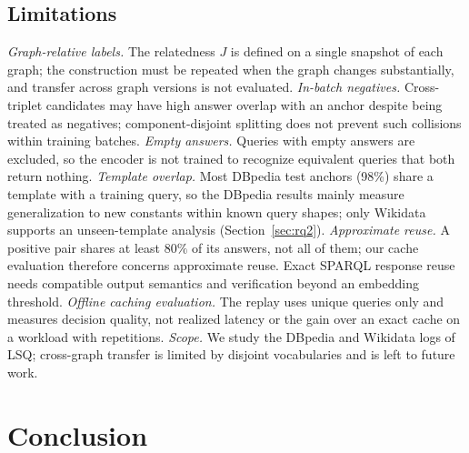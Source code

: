 \documentclass[runningheads]{llncs}
\begin{document}
\subsection{Limitations}
\label{sec:limitations}

\emph{Graph-relative labels.} The relatedness $J$ is defined on a single
snapshot of each graph; the construction must be repeated when the graph
changes substantially, and transfer across graph versions is not evaluated.
\emph{In-batch negatives.} Cross-triplet candidates may have high answer
overlap with an anchor despite being treated as negatives; component-disjoint
splitting does not prevent such collisions within training batches.
\emph{Empty answers.} Queries with empty answers are excluded, so the encoder
is not trained to recognize equivalent queries that both return nothing.
\emph{Template overlap.} Most DBpedia test anchors (98\%) share a template
with a training query, so the DBpedia results mainly measure generalization
to new constants within known query shapes; only Wikidata supports an
unseen-template analysis (Section~\ref{sec:rq2}).
\emph{Approximate reuse.} A positive pair shares at least $80\%$ of its
answers, not all of them; our cache evaluation therefore concerns approximate
reuse. Exact SPARQL response reuse needs compatible output semantics and
verification beyond an embedding threshold. \emph{Offline caching evaluation.} The replay uses
unique queries only and measures decision quality, not realized latency or the
gain over an exact cache on a workload with repetitions. \emph{Scope.} We study
the DBpedia and Wikidata logs of LSQ; cross-graph transfer is limited by
disjoint vocabularies and is left to future work.

\section{Conclusion}
\label{sec:conclusion}
\end{document}
